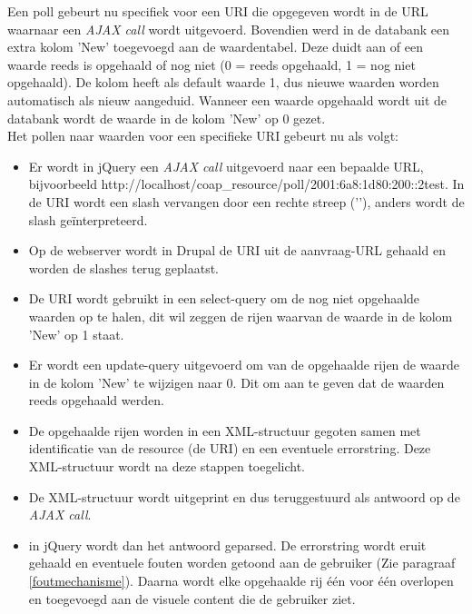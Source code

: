 Een poll gebeurt nu specifiek voor een URI die opgegeven wordt in de URL waarnaar een \textit{AJAX call} wordt uitgevoerd. Bovendien werd in de databank een extra kolom 'New' toegevoegd aan de waardentabel. Deze duidt aan of een waarde reeds is opgehaald of nog niet (0 = reeds opgehaald, 1 = nog niet opgehaald). De kolom heeft als default waarde 1, dus nieuwe waarden worden automatisch als nieuw aangeduid. Wanneer een waarde opgehaald wordt uit de databank wordt de waarde in de kolom 'New' op 0 gezet.\\
Het pollen naar waarden voor een specifieke URI gebeurt nu als volgt:
\begin{itemize}
\item Er wordt in jQuery een \textit{AJAX call} uitgevoerd naar een bepaalde URL, bijvoorbeeld http://localhost/coap\_resource/poll/2001:6a8:1d80:200::2\textbar test. In de URI wordt een slash vervangen door een rechte streep ('\textbar'), anders wordt de slash ge\"{i}nterpreteerd.
\item Op de webserver wordt in Drupal de URI uit de aanvraag-URL gehaald en worden de slashes terug geplaatst.
\item De URI wordt gebruikt in een select-query om de nog niet opgehaalde waarden op te halen, dit wil zeggen de rijen waarvan de waarde in de kolom 'New' op 1 staat.
\item Er wordt een update-query uitgevoerd om van de opgehaalde rijen de waarde in de kolom 'New' te wijzigen naar 0. Dit om aan te geven dat de waarden reeds opgehaald werden.
\item De opgehaalde rijen worden in een XML-structuur gegoten samen met identificatie van de resource (de URI) en een eventuele errorstring. Deze XML-structuur wordt na deze stappen toegelicht.
\item De XML-structuur wordt uitgeprint en dus teruggestuurd als antwoord op de \textit{AJAX call}.
\item in jQuery wordt dan het antwoord geparsed. De errorstring wordt eruit gehaald en eventuele fouten worden getoond aan de gebruiker (Zie paragraaf \ref{foutmechanisme}). Daarna wordt elke opgehaalde rij \'{e}\'{e}n voor \'{e}\'{e}n overlopen en toegevoegd aan de visuele content die de gebruiker ziet.
\end{itemize}

